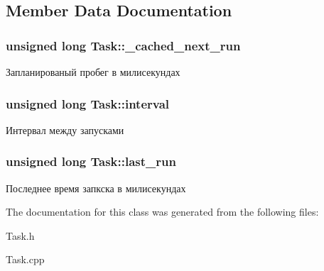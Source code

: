 \subsection{Member Data Documentation}
\hypertarget{class_task_a4de078e5174a6c9ae0b34cd378f766c5}{
\subsubsection[{\-\_\-cached\-\_\-next\-\_\-run}]{\setlength{\rightskip}{0pt plus 5cm}unsigned long Task\-::\-\_\-cached\-\_\-next\-\_\-run\hspace{0.3cm}{\ttfamily [protected]}}}\label{class_task_a4de078e5174a6c9ae0b34cd378f766c5}
Запланированый пробег в милисекундах \hypertarget{class_task_a3066331ddfd597f1b93e032c4da86e28}{
\subsubsection[{interval}]{\setlength{\rightskip}{0pt plus 5cm}unsigned long Task\-::interval\hspace{0.3cm}{\ttfamily [protected]}}}\label{class_task_a3066331ddfd597f1b93e032c4da86e28}
Интервал между запусками \hypertarget{class_task_a98a9b91b4fff2ca30790e6c4884fe2c8}{
\subsubsection[{last\-\_\-run}]{\setlength{\rightskip}{0pt plus 5cm}unsigned long Task\-::last\-\_\-run\hspace{0.3cm}{\ttfamily [protected]}}}\label{class_task_a98a9b91b4fff2ca30790e6c4884fe2c8}
Последнее время запкска в милисекундах 

The documentation for this class was generated from the following files\-:\begin{DoxyCompactItemize}
\item 
Task.\-h\item 
Task.\-cpp\end{DoxyCompactItemize}

